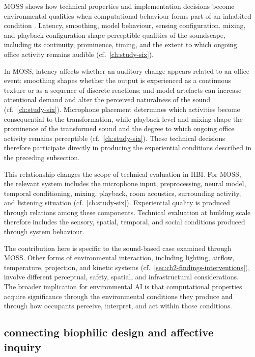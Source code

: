 MOSS shows how technical properties and implementation decisions become
environmental qualities when computational behaviour forms part of an
inhabited condition \cite{alavi2018artifacts, alavi2019introduction, wiberg2020interaction}. Latency, smoothing, model behaviour, sensing configuration, mixing, and playback configuration shape perceptible qualities of the soundscape, including its continuity, prominence, timing, and the extent to which ongoing office activity remains audible (cf.~\autoref{ch:study-six}).


In MOSS, latency affects whether an auditory change appears related to an office event; smoothing shapes whether the output is experienced as a continuous texture or as a sequence of discrete reactions; and model artefacts can increase attentional demand and alter the perceived naturalness of the sound (cf.~\autoref{ch:study-six}). Microphone placement determines which activities become consequential to the transformation, while playback level and mixing shape the prominence of the transformed sound and the degree to which ongoing office activity remains perceptible (cf.~\autoref{ch:study-six}). These technical decisions therefore participate directly in producing the experiential conditions described in the preceding subsection.

This relationship changes the scope of technical evaluation in HBI. For MOSS, the relevant system includes the microphone input, preprocessing, neural model, temporal conditioning, mixing, playback, room acoustics, surrounding activity, and listening situation \cite{alavi2018artifacts, alavi2019introduction, wiberg2020interaction} (cf.~\autoref{ch:study-six}). Experiential quality is produced through relations among these components. Technical evaluation at building scale therefore includes the sensory, spatial, temporal, and social conditions produced through system behaviour.

The contribution here is specific to the sound-based case examined through MOSS. Other forms of environmental interaction, including lighting, airflow, temperature, projection, and kinetic systems (cf.~\autoref{sec:ch2-findings-interventions}), involve different perceptual, safety, spatial, and infrastructural considerations. The broader implication for environmental AI is that computational properties acquire significance through the environmental conditions they produce and through how occupants perceive, interpret, and act within those conditions.

\subsection{connecting biophilic design and affective inquiry}
\label{subsec:moss-integration}

